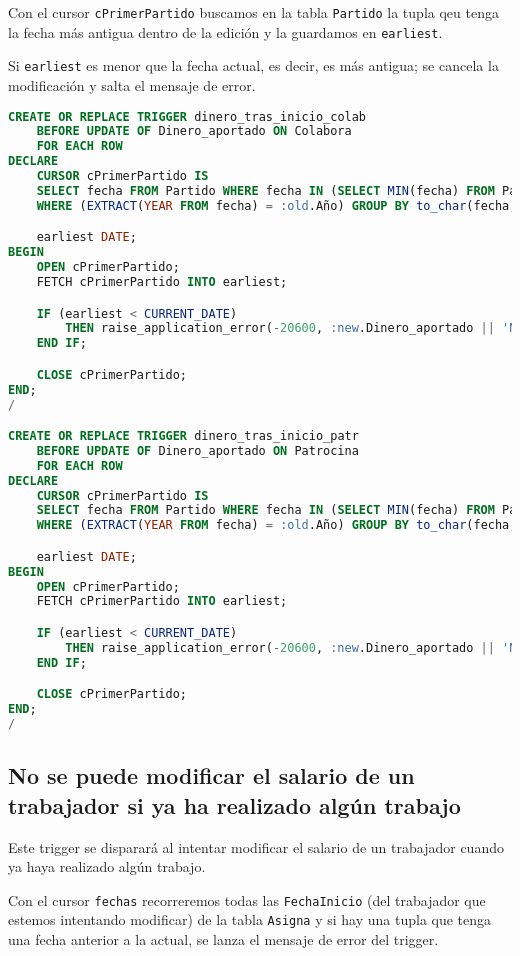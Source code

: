 Con el cursor \texttt{cPrimerPartido} buscamos en la tabla \texttt{Partido} la
tupla qeu tenga la fecha más antigua dentro de la edición y la guardamos en
\texttt{earliest}.

Si \texttt{earliest} es menor que la fecha actual, es decir, es más antigua; se
cancela la modificación y salta el mensaje de error.

\begin{lstlisting}[language=sql]
CREATE OR REPLACE TRIGGER dinero_tras_inicio_colab
	BEFORE UPDATE OF Dinero_aportado ON Colabora
	FOR EACH ROW
DECLARE
	CURSOR cPrimerPartido IS
	SELECT fecha FROM Partido WHERE fecha IN (SELECT MIN(fecha) FROM Partido
	WHERE (EXTRACT(YEAR FROM fecha) = :old.Año) GROUP BY to_char(fecha,'YYYY')) GROUP BY fecha;

	earliest DATE;
BEGIN
	OPEN cPrimerPartido;
	FETCH cPrimerPartido INTO earliest;

	IF (earliest < CURRENT_DATE)
		THEN raise_application_error(-20600, :new.Dinero_aportado || 'No se puede modificar el dinero aportado si ya ha comenzado el torneo');
	END IF;

	CLOSE cPrimerPartido;
END;
/

CREATE OR REPLACE TRIGGER dinero_tras_inicio_patr
	BEFORE UPDATE OF Dinero_aportado ON Patrocina
	FOR EACH ROW
DECLARE
	CURSOR cPrimerPartido IS
	SELECT fecha FROM Partido WHERE fecha IN (SELECT MIN(fecha) FROM Partido
	WHERE (EXTRACT(YEAR FROM fecha) = :old.Año) GROUP BY to_char(fecha,'YYYY')) GROUP BY fecha;

	earliest DATE;
BEGIN
	OPEN cPrimerPartido;
	FETCH cPrimerPartido INTO earliest;

	IF (earliest < CURRENT_DATE)
		THEN raise_application_error(-20600, :new.Dinero_aportado || 'No se puede modificar el dinero aportado si ya ha comenzado el torneo');
	END IF;

	CLOSE cPrimerPartido;
END;
/
\end{lstlisting}

\subsection{No se puede modificar el salario de un trabajador si ya ha realizado algún trabajo}
Este trigger se disparará al intentar modificar el salario de un trabajador
cuando ya haya realizado algún trabajo.

Con el cursor \texttt{fechas} recorreremos todas las \texttt{FechaInicio} (del
trabajador que estemos intentando modificar) de la tabla \texttt{Asigna} y si
hay una tupla que tenga una fecha anterior a la actual, se lanza el mensaje de
error del trigger.

